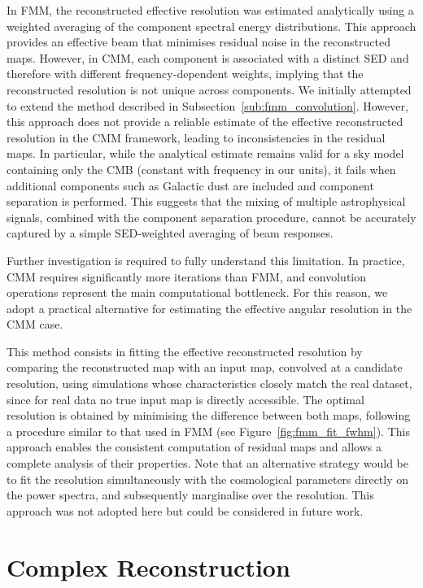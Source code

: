 \documentclass[../../thesis.tex]{subfiles}
\begin{document}
In FMM, the reconstructed effective resolution was estimated analytically using a weighted averaging of the component spectral energy distributions. This approach provides an effective beam that minimises residual noise in the reconstructed maps. However, in CMM, each component is associated with a distinct SED and therefore with different frequency-dependent weights, implying that the reconstructed resolution is not unique across components.
We initially attempted to extend the method described in Subsection~\ref{sub:fmm_convolution}. However, this approach does not provide a reliable estimate of the effective reconstructed resolution in the CMM framework, leading to inconsistencies in the residual maps. In particular, while the analytical estimate remains valid for a sky model containing only the CMB (constant with frequency in our units), it fails when additional components such as Galactic dust are included and component separation is performed. This suggests that the mixing of multiple astrophysical signals, combined with the component separation procedure, cannot be accurately captured by a simple SED-weighted averaging of beam responses.

Further investigation is required to fully understand this limitation. In practice, CMM requires significantly more iterations than FMM, and convolution operations represent the main computational bottleneck. For this reason, we adopt a practical alternative for estimating the effective angular resolution in the CMM case.

This method consists in fitting the effective reconstructed resolution by comparing the reconstructed map with an input map, convolved at a candidate resolution, using simulations whose characteristics closely match the real dataset, since for real data no true input map is directly accessible. The optimal resolution is obtained by minimising the difference between both maps, following a procedure similar to that used in FMM (see Figure~\ref{fig:fmm_fit_fwhm}). This approach enables the consistent computation of residual maps and allows a complete analysis of their properties.
Note that an alternative strategy would be to fit the resolution simultaneously with the cosmological parameters directly on the power spectra, and subsequently marginalise over the resolution. This approach was not adopted here but could be considered in future work.

\section{Complex Reconstruction}
\end{document}
